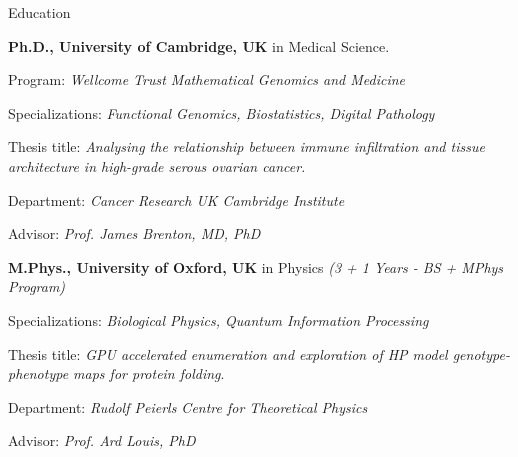 \begin{rubric}{Education}

\entry*[10/2015 -- 10/2020]%
	\textbf{Ph.D., University of Cambridge, UK} in Medical Science.
        \par Program: \emph{Wellcome Trust Mathematical Genomics and Medicine}
        \par Specializations: \emph{Functional Genomics, Biostatistics, Digital Pathology}
	\par Thesis title: \emph{Analysing the relationship between immune infiltration and tissue architecture in high-grade serous ovarian cancer.}
        \par Department: \emph{Cancer Research UK Cambridge Institute}
        \par Advisor: \emph{Prof. James Brenton, MD, PhD}

%
\entry*[2011 -- 2015]%
    \textbf{M.Phys., University of Oxford, UK} in Physics \emph{ (3 + 1 Years - BS + MPhys Program)} 
    \par Specializations: \emph{Biological Physics, Quantum Information Processing} 
    \par Thesis title: \emph{GPU accelerated enumeration and exploration of HP model genotype-phenotype maps for protein folding}.
    \par Department: \emph{Rudolf Peierls Centre for Theoretical Physics}
    \par Advisor: \emph{Prof. Ard Louis, PhD} 
% 
\end{rubric}